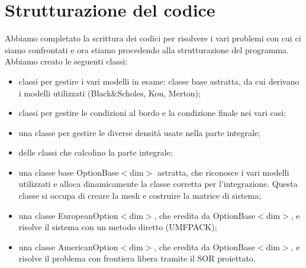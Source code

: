 \documentclass[a4paper,10pt]{article}
\begin{document}
\section{Strutturazione del codice}

Abbiamo completato la scrittura dei codici per risolvere i vari problemi con cui ci siamo confrontati e ora stiamo procedendo alla strutturazione del programma.\\Abbiamo creato le seguenti classi:
\begin{itemize}
\item{classi per gestire i vari modelli in esame: classe base astratta, da cui derivano i modelli utilizzati (Black\&Scholes, Kou, Merton);}
\item{classi per gestire le condizioni al bordo e la condizione finale nei vari casi;}
\item{una classe per gestire le diverse densit\`a usate nella parte integrale;}
\item{delle classi che calcolino la parte integrale;}
\item{una classe base \textsf{OptionBase$<$dim$>$} astratta, che riconosce i vari modelli utilizzati e alloca dinamicamente la classe corretta per l'integrazione. Questa classe si occupa di creare la mesh e costruire la matrice di sistema;}
\item{una classe \textsf{EuropeanOption$<$dim$>$}, che eredita da \textsf{OptionBase$<$dim$>$}, e risolve il sistema con un metodo diretto (UMFPACK);}
\item{una classe \textsf{AmericanOption$<$dim$>$}, che eredita da \textsf{OptionBase$<$dim$>$}, e risolve il problema con frontiera libera tramite il SOR proiettato.}
\end{itemize}
\end{document}
